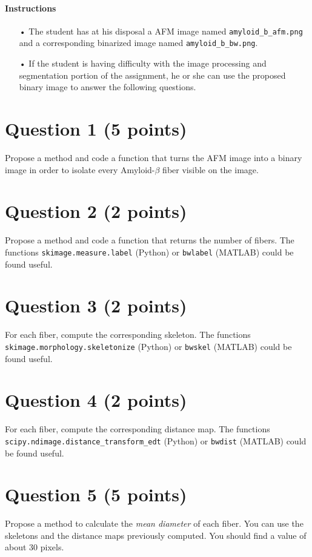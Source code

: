 \documentclass{article}
\begin{document}
\paragraph*{\textbf{Instructions}}
\begin{itemize}
\item[•] The student has at his disposal a AFM image named \texttt{amyloid\_b\_afm.png} and a corresponding binarized image named \texttt{amyloid\_b\_bw.png}.
\item[•] If the student is having difficulty with the image processing and segmentation portion of the assignment, he or she can use the proposed binary image to answer the following questions.
\end{itemize}


\section*{Question 1 (5 points)}
Propose a method and code a function that turns the AFM image into a binary image in order to isolate every Amyloid-$\beta$ fiber visible on the image.

\section*{Question 2 (2 points)}
Propose a method and code a function that returns the number of fibers. The functions \texttt{skimage.measure.label} (Python) or \texttt{bwlabel} (MATLAB) could be found useful.

\section*{Question 3 (2 points)}
For each fiber, compute the corresponding skeleton. The functions \texttt{skimage.morphology.skeletonize} (Python) or \texttt{bwskel} (MATLAB) could be found useful.

\section*{Question 4 (2 points)}
For each fiber, compute the corresponding distance map. The functions \texttt{scipy.ndimage.distance\_transform\_edt} (Python) or \texttt{bwdist} (MATLAB) could be found useful.

\section*{Question 5 (5 points)}
Propose a method to calculate the \textit{mean diameter} of each fiber. You can use the skeletons and the distance maps previously computed. You should find a value of about 30 pixels.
\end{document}
